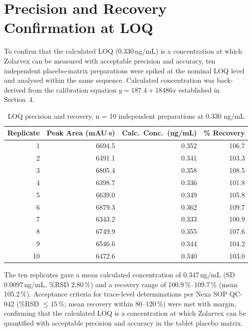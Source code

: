
\section{Precision and Recovery Confirmation at LOQ}

To confirm that the calculated LOQ (0.330\,ng/mL) is a concentration at which Zolarvex
can be measured with acceptable precision and accuracy, ten independent placebo-matrix
preparations were spiked at the nominal LOQ level and analysed within the same
sequence. Calculated concentration was back-derived from the calibration equation
$y = 187.4 + 18486x$ established in Section~4.

\begin{table}[h!]
\centering
\small
\caption{LOQ precision and recovery, n = 10 independent preparations at 0.330 ng/mL}
\label{tab:loqprec}
\begin{tabularx}{\linewidth}{@{}r r r r@{}}
\toprule
\textbf{Replicate} & \textbf{Peak Area (mAU$\cdot$s)} & \textbf{Calc.\ Conc.\ (ng/mL)} & \textbf{\% Recovery} \\
\midrule
1  & 6694.5 & 0.352 & 106.7 \\
2  & 6491.1 & 0.341 & 103.3 \\
3  & 6805.4 & 0.358 & 108.5 \\
4  & 6398.7 & 0.336 & 101.8 \\
5  & 6639.0 & 0.349 & 105.8 \\
6  & 6879.3 & 0.362 & 109.7 \\
7  & 6343.2 & 0.333 & 100.9 \\
8  & 6749.9 & 0.355 & 107.6 \\
9  & 6546.6 & 0.344 & 104.2 \\
10 & 6472.6 & 0.340 & 103.0 \\
\bottomrule
\end{tabularx}
\end{table}

The ten replicates gave a mean calculated concentration of 0.347\,ng/mL (SD
0.0097\,ng/mL, \%RSD 2.80\,\%) and a recovery range of 100.9\,\%--109.7\,\% (mean
105.2\,\%). Acceptance criteria for trace-level determinations per Nexa SOP QC-042
(\%RSD $\leq 15\,\%$; mean recovery within 80--120\,\%) were met with margin, confirming
that the calculated LOQ is a concentration at which Zolarvex can be quantified with
acceptable precision and accuracy in the tablet placebo matrix.
